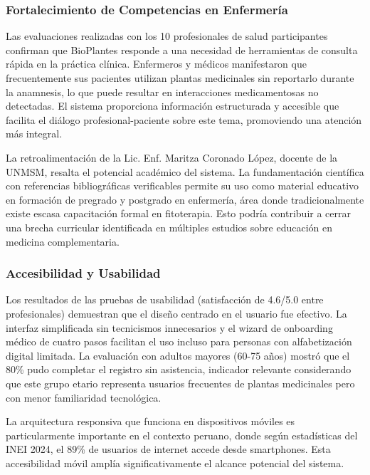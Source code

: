 \documentclass[12pt,a4paper]{article}
\begin{document}
\subsubsection{Fortalecimiento de Competencias en Enfermería}

Las evaluaciones realizadas con los 10 profesionales de salud participantes confirman que BioPlantes responde a una necesidad de herramientas de consulta rápida en la práctica clínica. Enfermeros y médicos manifestaron que frecuentemente sus pacientes utilizan plantas medicinales sin reportarlo durante la anamnesis, lo que puede resultar en interacciones medicamentosas no detectadas. El sistema proporciona información estructurada y accesible que facilita el diálogo profesional-paciente sobre este tema, promoviendo una atención más integral.

La retroalimentación de la Lic. Enf. Maritza Coronado López, docente de la UNMSM, resalta el potencial académico del sistema. La fundamentación científica con referencias bibliográficas verificables permite su uso como material educativo en formación de pregrado y postgrado en enfermería, área donde tradicionalmente existe escasa capacitación formal en fitoterapia. Esto podría contribuir a cerrar una brecha curricular identificada en múltiples estudios sobre educación en medicina complementaria.

\subsubsection{Accesibilidad y Usabilidad}

Los resultados de las pruebas de usabilidad (satisfacción de 4.6/5.0 entre profesionales) demuestran que el diseño centrado en el usuario fue efectivo. La interfaz simplificada sin tecnicismos innecesarios y el wizard de onboarding médico de cuatro pasos facilitan el uso incluso para personas con alfabetización digital limitada. La evaluación con adultos mayores (60-75 años) mostró que el 80\% pudo completar el registro sin asistencia, indicador relevante considerando que este grupo etario representa usuarios frecuentes de plantas medicinales pero con menor familiaridad tecnológica.

La arquitectura responsiva que funciona en dispositivos móviles es particularmente importante en el contexto peruano, donde según estadísticas del INEI 2024, el 89\% de usuarios de internet accede desde smartphones. Esta accesibilidad móvil amplía significativamente el alcance potencial del sistema.
\end{document}
